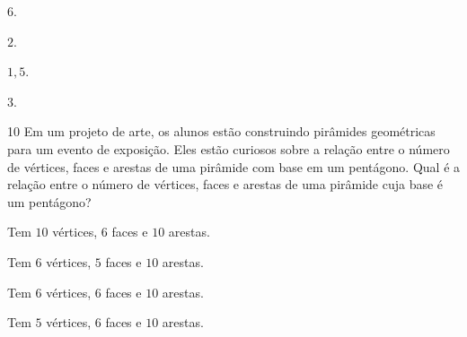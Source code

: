 \begin{escolha}
\item $6$.
\item $2$.
\item $1,5$.
\item $3$.
\end{escolha}


\pagebreak
\num{10} Em um projeto de arte, os alunos estão construindo pirâmides geométricas
para um evento de exposição. Eles estão curiosos sobre a relação entre o número de
vértices, faces e arestas de uma pirâmide com base em um pentágono. Qual é a relação
entre o número de vértices, faces e arestas de uma pirâmide cuja base é um pentágono?

\begin{escolha}
\item Tem $10$ vértices, $6$ faces e $10$ arestas.

\item Tem $6$ vértices, $5$ faces e $10$ arestas.

\item Tem $6$ vértices, $6$ faces e $10$ arestas.

\item Tem $5$ vértices, $6$ faces e $10$ arestas.
\end{escolha}


